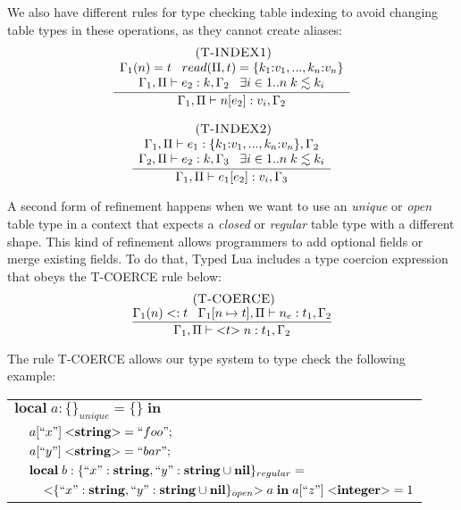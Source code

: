 We also have different rules for type checking table indexing to avoid
changing table types in these operations, as they cannot create aliases:
\[
\begin{array}{c}
\begin{array}{c}
\; (\textsc{T-INDEX1})\\
\dfrac{\begin{array}{c}
       \Gamma_{1}(n) = t \;\;\;
       read(\Pi, t) = \{k_{1}{:}v_{1}, ..., k_{n}{:}v_{n}\}\\
       \Gamma_{1}, \Pi \vdash e_{2}:k, \Gamma_{2} \;\;\;
       \exists i \in 1{..}n \; k \lesssim k_{i}
       \end{array}}
      {\Gamma_{1}, \Pi \vdash n[e_{2}]:v_{i}, \Gamma_{2}}
\end{array}
\\ \\
\begin{array}{c}
\; (\textsc{T-INDEX2})\\
\dfrac{\begin{array}{c}
       \Gamma_{1}, \Pi \vdash e_{1}:\{k_{1}{:}v_{1}, ..., k_{n}{:}v_{n}\}, \Gamma_{2}\\
       \Gamma_{2}, \Pi \vdash e_{2}:k, \Gamma_{3} \;\;\;
       \exists i \in 1{..}n \; k \lesssim k_{i}
       \end{array}}
      {\Gamma_{1}, \Pi \vdash e_{1}[e_{2}]:v_{i}, \Gamma_{3}}
\end{array}
\end{array}
\]

A second form of refinement happens when we want to use an
\emph{unique} or \emph{open} table type in a context that expects a
\emph{closed} or \emph{regular} table type with a different shape.
This kind of refinement allows programmers to add optional fields
or merge existing fields.
To do that, Typed Lua includes a type coercion expression that
obeys the \textsc{T-COERCE} rule below:
\[
\begin{array}{c}
\; (\textsc{T-COERCE})\\
\dfrac{\Gamma_{1}(n) <: t \;\;\;
       \Gamma_{1}[n \mapsto t], \Pi \vdash n_{e}:t_{1}, \Gamma_{2}}
      {\Gamma_{1}, \Pi \vdash {<}t{>} \; n:t_{1}, \Gamma_{2}}
\end{array}
\]

The rule \textsc{T-COERCE} allows our type system to type check the following example:
\begin{center}
\begin{tabular}{lll}
\multicolumn{3}{l}{$\mathbf{local} \; a:\{\}_{unique} = \{ \} \; \mathbf{in}$}\\
& \multicolumn{2}{l}{$a[``x"] \; {<}\mathbf{string}{>} = ``foo";$}\\
& \multicolumn{2}{l}{$a[``y"] \; {<}\mathbf{string}{>} = ``bar";$}\\
& \multicolumn{2}{l}{$\mathbf{local} \; b:\{``x":\mathbf{string}, ``y":\mathbf{string} \cup \mathbf{nil} \}_{regular} =$}\\
& & \multicolumn{1}{l}{${<}\{``x":\mathbf{string}, ``y":\mathbf{string} \cup \mathbf{nil}\}_{open}{>} \; a \; \mathbf{in} \; a[``z"] \; {<}\mathbf{integer}{>} = 1$}
\end{tabular}
\end{center}

